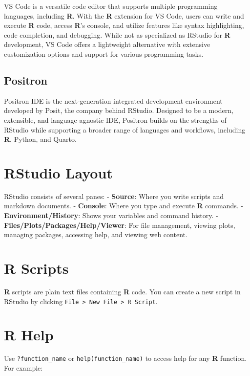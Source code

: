 \documentclass[
  letterpaper,
  DIV=11,
  numbers=noendperiod]{scrreprt}
\begin{document}
{VS Code is a versatile code editor that supports multiple programming
languages, including \textbf{R}. With the \textbf{R} extension for VS
Code, users can write and execute \textbf{R} code, access \textbf{R}'s
console, and utilize features like syntax highlighting, code completion,
and debugging. While not as specialized as RStudio for \textbf{R}
development, VS Code offers a lightweight alternative with extensive
customization options and support for various programming tasks.

\subsection{Positron}\label{positron}

Positron IDE is the next-generation integrated development environment
developed by Posit, the company behind RStudio. Designed to be a modern,
extensible, and language-agnostic IDE, Positron builds on the strengths
of RStudio while supporting a broader range of languages and workflows,
including \textbf{R}, Python, and Quarto.

\section{RStudio Layout}\label{rstudio-layout}

RStudio consists of several panes: - \textbf{Source}: Where you write
scripts and markdown documents. - \textbf{Console}: Where you type and
execute \textbf{R} commands. - \textbf{Environment/History}: Shows your
variables and command history. -
\textbf{Files/Plots/Packages/Help/Viewer}: For file management, viewing
plots, managing packages, accessing help, and viewing web content.

\section{R Scripts}\label{r-scripts}

\textbf{R} scripts are plain text files containing \textbf{R} code. You
can create a new script in RStudio by clicking
\texttt{File\ \textgreater{}\ New\ File\ \textgreater{}\ R\ Script}.

\section{R Help}\label{r-help}

Use \texttt{?function\_name} or \texttt{help(function\_name)} to access
help for any \textbf{R} function. For example:

}
\end{document}
